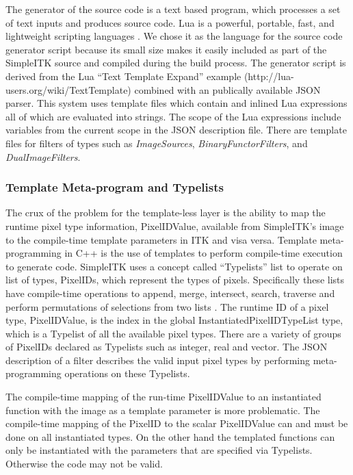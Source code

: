 \documentclass{frontiersMED} %
\begin{document}
The generator of the source code is a text based program, which
processes a set of text inputs and produces source code. Lua is a
powerful, portable, fast, and lightweight scripting languages
\cite{Ierusalimschy2006}. We chose it as the language for the source code
generator script because its small size makes it easily included as
part of the SimpleITK source and compiled during the build
process. The generator script is derived from the Lua ``Text Template
Expand'' example (http://lua-users.org/wiki/TextTemplate) combined
with an publically available JSON  parser. This system uses template
files which contain and inlined Lua expressions all of which are
evaluated into strings. The scope of the Lua expressions include
variables from the current scope in the JSON description file. There
are template files for filters of types such as \textit{ImageSources},
\textit{BinaryFunctorFilters}, and \textit{DualImageFilters}.

\subsubsection{Template Meta-program and Typelists}
The crux of the problem for the template-less layer is the ability to
map the runtime pixel type information, PixelIDValue, available from
SimpleITK's image to the compile-time template parameters in ITK and
visa versa. Template meta-programming in C++ is the use of templates
to perform compile-time execution to generate code. SimpleITK uses a
concept called ``Typelists'' list to operate on list of types, PixelIDs,
which represent the types of pixels. Specifically these lists have
compile-time operations to append, merge, intersect, search, traverse
and perform permutations of selections from two lists
\cite{Alexandrescu2001}. The runtime ID of a pixel type, PixelIDValue, is
the index in the global InstantiatedPixelIDTypeList type, which is a
Typelist of all the available pixel types. There are a variety of
groups of PixelIDs declared as Typelists such as integer, real and
vector. The JSON description of a filter describes the valid input
pixel types by performing meta-programming operations on these
Typelists.

The compile-time mapping of the run-time PixelIDValue to an
instantiated function with the image as a template parameter is more
problematic. The compile-time mapping of the PixelID to the scalar
PixelIDValue can and must be done on all instantiated types. On the
other hand the templated functions can only be instantiated with the
parameters that are specified via Typelists. Otherwise the code may
not be valid.
\end{document}
